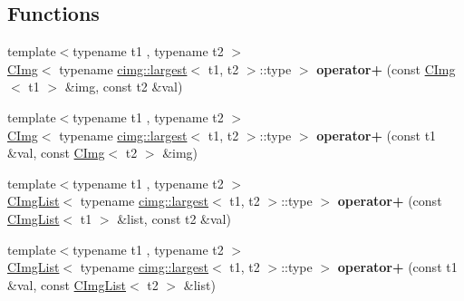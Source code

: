 \subsection*{Functions}
\begin{DoxyCompactItemize}
\item 
\hypertarget{namespacecimg__library_adb774624ab9e06216e19a7d1265fa727}{
{\footnotesize template$<$typename t1 , typename t2 $>$ }\\\hyperlink{structcimg__library_1_1_c_img}{CImg}$<$ typename \hyperlink{structcimg__library_1_1cimg_1_1largest}{cimg::largest}$<$ t1, t2 $>$::type $>$ {\bfseries operator+} (const \hyperlink{structcimg__library_1_1_c_img}{CImg}$<$ t1 $>$ \&img, const t2 \&val)}
\label{namespacecimg__library_adb774624ab9e06216e19a7d1265fa727}

\item 
\hypertarget{namespacecimg__library_a1a2a174e15be94e4fc7fab13224a3d50}{
{\footnotesize template$<$typename t1 , typename t2 $>$ }\\\hyperlink{structcimg__library_1_1_c_img}{CImg}$<$ typename \hyperlink{structcimg__library_1_1cimg_1_1largest}{cimg::largest}$<$ t1, t2 $>$::type $>$ {\bfseries operator+} (const t1 \&val, const \hyperlink{structcimg__library_1_1_c_img}{CImg}$<$ t2 $>$ \&img)}
\label{namespacecimg__library_a1a2a174e15be94e4fc7fab13224a3d50}

\item 
\hypertarget{namespacecimg__library_a35481213682ebbddc2869f00c100dfb3}{
{\footnotesize template$<$typename t1 , typename t2 $>$ }\\\hyperlink{structcimg__library_1_1_c_img_list}{CImgList}$<$ typename \hyperlink{structcimg__library_1_1cimg_1_1largest}{cimg::largest}$<$ t1, t2 $>$::type $>$ {\bfseries operator+} (const \hyperlink{structcimg__library_1_1_c_img_list}{CImgList}$<$ t1 $>$ \&list, const t2 \&val)}
\label{namespacecimg__library_a35481213682ebbddc2869f00c100dfb3}

\item 
\hypertarget{namespacecimg__library_a23111a2f231f68e51b3bee9bdf5c76e9}{
{\footnotesize template$<$typename t1 , typename t2 $>$ }\\\hyperlink{structcimg__library_1_1_c_img_list}{CImgList}$<$ typename \hyperlink{structcimg__library_1_1cimg_1_1largest}{cimg::largest}$<$ t1, t2 $>$::type $>$ {\bfseries operator+} (const t1 \&val, const \hyperlink{structcimg__library_1_1_c_img_list}{CImgList}$<$ t2 $>$ \&list)}
\label{namespacecimg__library_a23111a2f231f68e51b3bee9bdf5c76e9}


\end{DoxyCompactItemize}
